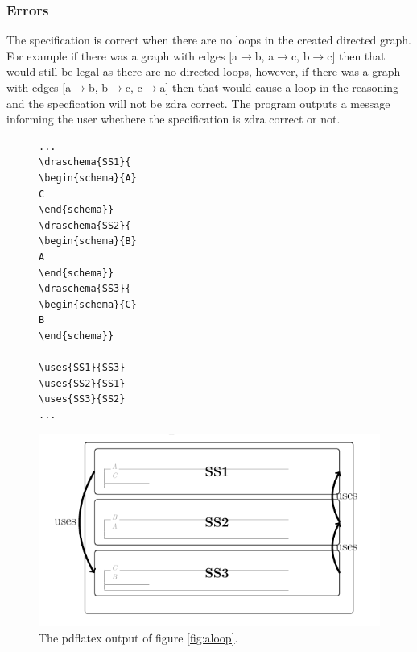\subsubsection{Errors}
\label{subsubsec:zdra_looperrors}

The specification is correct when there are no loops in the created directed graph. For example if there was a graph with edges [a$\rightarrow$b, a$\rightarrow$c, b$\rightarrow$c] then that would still be legal as there are no directed loops, however, if there was a graph with edges [a$\rightarrow$b, b$\rightarrow$c, c$\rightarrow$a] then that would cause a loop in the reasoning and the specfication will not be \gls{zdra} correct. The program outputs a message informing the user whethere the specification is \gls{zdra} correct or not.

\begin{figure}[H]
\vspace{-0.2in}
\centering
\begin{minipage}{0.45\textwidth}
\centering
\begin{scriptsize}
\begin{BVerbatim}
...
\draschema{SS1}{
\begin{schema}{A}
C
\end{schema}}
\draschema{SS2}{
\begin{schema}{B}
A
\end{schema}}
\draschema{SS3}{
\begin{schema}{C}
B
\end{schema}}

\uses{SS1}{SS3}
\uses{SS2}{SS1}
\uses{SS3}{SS2}
...
\end{BVerbatim}
\end{scriptsize}
\vspace{-0.18in}
\caption{An example of a loop in the reasoning in a labelled ZDRa specification.\label{fig:aloop}}
\vspace{-0.2in}
\end{minipage}\hfill
\begin{minipage}{0.45\textwidth}
\centering
\includegraphics[scale=0.33]{Figures/zdra/zdraloop.png}
\vspace{-0.18in}
\caption{The pdflatex output of figure \ref{fig:aloop}.  \label{fig:zdraerror1}}
\vspace{-0.2in}
\end{minipage}
\end{figure}

